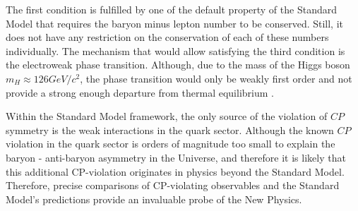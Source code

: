 The first condition is fulfilled by one of the default property of the Standard Model that requires the baryon minus lepton number to be conserved. Still, it does not have any restriction on the conservation of each of these numbers individually. The mechanism that would allow satisfying the third condition is the electroweak phase transition. Although, due to the mass of the Higgs boson $m_H \approx 126 GeV/c^{2}$, the phase transition would only be weakly first order and not provide a strong enough departure from thermal equilibrium \cite{phase_transiton}. 

 Within the Standard Model framework, the only source of the violation of $CP$ symmetry is the weak interactions in the quark sector. Although the known $CP$ violation in the quark sector is orders of magnitude too small to explain the baryon - anti-baryon asymmetry in the Universe, and therefore it is likely that this additional CP-violation originates in physics beyond the Standard Model. Therefore, precise comparisons of CP-violating observables and the Standard Model's predictions provide an invaluable probe of the New Physics.